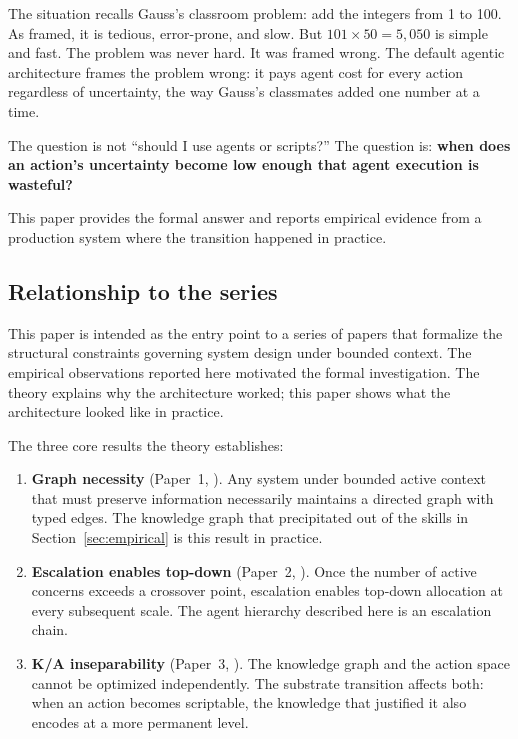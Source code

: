\documentclass[11pt]{article}
\theoremstyle{definition}
\begin{document}
The situation recalls Gauss's classroom problem: add the integers from
1 to 100. As framed, it is tedious, error-prone, and slow. But
$101 \times 50 = 5{,}050$ is simple and fast. The problem was never
hard. It was framed wrong. The default agentic architecture frames the
problem wrong: it pays agent cost for every action regardless of
uncertainty, the way Gauss's classmates added one number at a time.

The question is not ``should I use agents or scripts?'' The question is:
\textbf{when does an action's uncertainty become low enough that agent
execution is wasteful?}

This paper provides the formal answer and reports empirical evidence
from a production system where the transition happened in practice.

\subsection{Relationship to the series}

This paper is intended as the entry point to a series of papers that
formalize the structural constraints governing system design under
bounded context. The empirical observations reported here motivated
the formal investigation. The theory explains why the architecture
worked; this paper shows what the architecture looked like in practice.

The three core results the theory establishes:

\begin{enumerate}
\item \textbf{Graph necessity} (Paper~1, \cite{McCarthy2026a}). Any
   system under bounded active context that must preserve information
   necessarily maintains a directed graph with typed edges. The
   knowledge graph that precipitated out of the skills in
   Section~\ref{sec:empirical} is this result in practice.

\item \textbf{Escalation enables top-down} (Paper~2, \cite{McCarthy2026b}).
   Once the number of active concerns exceeds a crossover point,
   escalation enables top-down allocation at every subsequent scale.
   The agent hierarchy described here is an escalation chain.

\item \textbf{K/A inseparability} (Paper~3, \cite{McCarthy2026c}). The
   knowledge graph and the action space cannot be optimized
   independently. The substrate transition affects both: when an action
   becomes scriptable, the knowledge that justified it also encodes at
   a more permanent level.
\end{enumerate}
\end{document}
